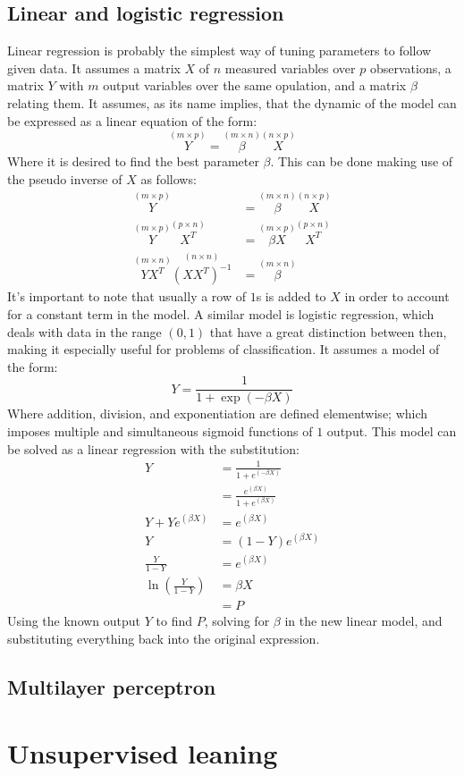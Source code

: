 \subsection{Linear and logistic regression\label{sec:regression}}

Linear regression is probably the simplest way of tuning parameters to follow
given data. It assumes a matrix $X$ of $n$ measured variables over $p$
observations, a matrix $Y$ with $m$ output variables over the same opulation,
and a matrix $\beta$ relating them. It assumes, as its name implies, that the
dynamic of the model can be expressed as a linear equation of the form: 
%
\begin{equation}\label{eq:linear}
    \overset{(m\times p)}{Y}
    = \overset{(m\times n)}{\beta} \overset{(n\times p)}{X}
\end{equation}
%
Where it is desired to find the best parameter $\beta$. This can be done making
use of the pseudo inverse of $X$ as follows:
%
\begin{align*}
    \overset{(m\times p)}{Y}
        &= \overset{(m\times n)}{\beta} \overset{(n\times p)}{X}\\
    \overset{(m\times p)}{Y}\overset{(p\times n)}{X^T}
        &= \overset{(m\times p)}{\beta X} \overset{(p\times n)}{X^T}\nonumber\\
    \overset{(m\times n)}{Y X^T} \overset{(n\times n)}{\left(X X^T\right)^{-1}}
        &= \overset{(m\times n)}{\beta}
\end{align*}
%
It's important to note that usually a row of $1$s is added to $X$ in order to
account for a constant term in the model. A similar model is logistic
regression, which deals with data in the range $(0, 1)$ that have a great
distinction between then, making it especially useful for problems of
classification. It assumes a model of the form:
%
\begin{equation}
    Y = \frac{1}{1+\exp{(-\beta X)}}
\end{equation}
%
Where addition, division, and exponentiation are defined elementwise; which
imposes multiple and simultaneous sigmoid functions of $1$ output. 
This model can be solved as a linear regression with the substitution:
%
\begin{align*}
    Y &= \frac{1}{1+e^{(-\beta X)}}\nonumber\\
        &= \frac{e^{(\beta X)}}{1+e^{(\beta X)}}\\
    Y+Ye^{(\beta X)}
        &= e^{(\beta X)}\\
    Y &= (1-Y) e^{(\beta X)}\\
    \frac{Y}{1-Y} &= e^{(\beta X)}\\
    \ln{\left(\frac{Y}{1-Y}\right)} &= \beta X\\
        &= P
\end{align*}
%
Using the known output $Y$ to find $P$, solving for $\beta$ in the new linear
model, and substituting everything back into the original expression.



\subsection{Multilayer perceptron\label{sec:nn}}

\section{Unsupervised leaning\label{sec:unsupervised}}